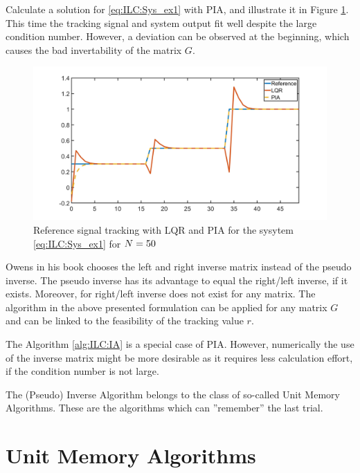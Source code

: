 \begin{exam}
	\label{ex:ILC:PIA}
	Calculate a solution for \eqref{eq:ILC:Sys_ex1} with PIA, and illustrate it in Figure \ref{fig:ILC:Ex1_PIA}. 	
	This time the tracking signal and system output fit well despite the large condition number. However, a deviation can be observed at the beginning, which causes the bad invertability of the matrix $G$. 
	  
	\begin{figure}[ht!]
		\centering
		\includegraphics[width=\textwidth]{fig/Ex1_PIA.jpg}
		\caption{Reference signal tracking with LQR and PIA for the sysytem \eqref{eq:ILC:Sys_ex1} for $N = 50$ }
		\label{fig:ILC:Ex1_PIA}
	\end{figure}
\end{exam}


Owens in his book \cite{ILC} chooses the left and right inverse matrix instead of the pseudo inverse. 
The pseudo inverse has its advantage to equal the right/left inverse, if it exists. Moreover, for right/left inverse does not exist for any matrix. 
The algorithm in the above presented formulation can be applied for any matrix $G$ and can be linked to the feasibility of the tracking value $r$. 
 	
The Algorithm \ref{alg:ILC:IA} is a special case of PIA. However, numerically the use of the inverse matrix might be more desirable as it requires less calculation effort, if the condition number is not large. 

The (Pseudo) Inverse Algorithm belongs to the class of so-called Unit Memory Algorithms. These are the algorithms which can  ''remember'' the last trial. 

\section{Unit Memory Algorithms}

